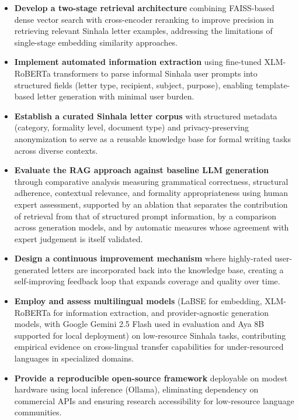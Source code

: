 \documentclass[12pt]{uomthesis}
\begin{document}
\begin{itemize}
    \item \textbf{Develop a two-stage retrieval architecture} combining FAISS-based dense vector search with cross-encoder reranking to improve precision in retrieving relevant Sinhala letter examples, addressing the limitations of single-stage embedding similarity approaches.
    
    \item \textbf{Implement automated information extraction} using fine-tuned XLM-RoBERTa transformers to parse informal Sinhala user prompts into structured fields (letter type, recipient, subject, purpose), enabling template-based letter generation with minimal user burden.
    
    \item \textbf{Establish a curated Sinhala letter corpus} with structured metadata (category, formality level, document type) and privacy-preserving anonymization to serve as a reusable knowledge base for formal writing tasks across diverse contexts.
    
    \item \textbf{Evaluate the RAG approach against baseline LLM generation} through comparative analysis measuring grammatical correctness, structural adherence, contextual relevance, and formality appropriateness using human expert assessment, supported by an ablation that separates the contribution of retrieval from that of structured prompt information, by a comparison across generation models, and by automatic measures whose agreement with expert judgement is itself validated.
    
    \item \textbf{Design a continuous improvement mechanism} where highly-rated user-generated letters are incorporated back into the knowledge base, creating a self-improving feedback loop that expands coverage and quality over time.
    
    \item \textbf{Employ and assess multilingual models} (LaBSE for embedding, XLM-RoBERTa for information extraction, and provider-agnostic generation models, with Google Gemini 2.5 Flash used in evaluation and Aya 8B supported for local deployment) on low-resource Sinhala tasks, contributing empirical evidence on cross-lingual transfer capabilities for under-resourced languages in specialized domains.
    
    \item \textbf{Provide a reproducible open-source framework} deployable on modest hardware using local inference (Ollama), eliminating dependency on commercial APIs and ensuring research accessibility for low-resource language communities.
\end{itemize}
\end{document}
